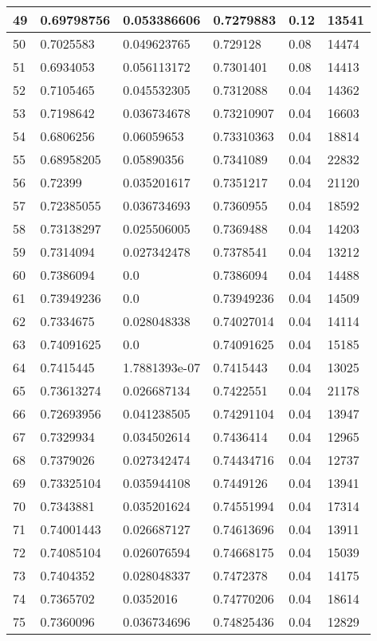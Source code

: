 \begin{longtable}{|l|l|l|l|l|l|}
49 & 0.69798756 & 0.053386606 & 0.7279883 & 0.12 & 13541 \\ \hline 
50 & 0.7025583 & 0.049623765 & 0.729128 & 0.08 & 14474 \\ \hline 
51 & 0.6934053 & 0.056113172 & 0.7301401 & 0.08 & 14413 \\ \hline 
52 & 0.7105465 & 0.045532305 & 0.7312088 & 0.04 & 14362 \\ \hline 
53 & 0.7198642 & 0.036734678 & 0.73210907 & 0.04 & 16603 \\ \hline 
54 & 0.6806256 & 0.06059653 & 0.73310363 & 0.04 & 18814 \\ \hline 
55 & 0.68958205 & 0.05890356 & 0.7341089 & 0.04 & 22832 \\ \hline 
56 & 0.72399 & 0.035201617 & 0.7351217 & 0.04 & 21120 \\ \hline 
57 & 0.72385055 & 0.036734693 & 0.7360955 & 0.04 & 18592 \\ \hline 
58 & 0.73138297 & 0.025506005 & 0.7369488 & 0.04 & 14203 \\ \hline 
59 & 0.7314094 & 0.027342478 & 0.7378541 & 0.04 & 13212 \\ \hline 
60 & 0.7386094 & 0.0 & 0.7386094 & 0.04 & 14488 \\ \hline 
61 & 0.73949236 & 0.0 & 0.73949236 & 0.04 & 14509 \\ \hline 
62 & 0.7334675 & 0.028048338 & 0.74027014 & 0.04 & 14114 \\ \hline 
63 & 0.74091625 & 0.0 & 0.74091625 & 0.04 & 15185 \\ \hline 
64 & 0.7415445 & 1.7881393e-07 & 0.7415443 & 0.04 & 13025 \\ \hline 
65 & 0.73613274 & 0.026687134 & 0.7422551 & 0.04 & 21178 \\ \hline 
66 & 0.72693956 & 0.041238505 & 0.74291104 & 0.04 & 13947 \\ \hline 
67 & 0.7329934 & 0.034502614 & 0.7436414 & 0.04 & 12965 \\ \hline 
68 & 0.7379026 & 0.027342474 & 0.74434716 & 0.04 & 12737 \\ \hline 
69 & 0.73325104 & 0.035944108 & 0.7449126 & 0.04 & 13941 \\ \hline 
70 & 0.7343881 & 0.035201624 & 0.74551994 & 0.04 & 17314 \\ \hline 
71 & 0.74001443 & 0.026687127 & 0.74613696 & 0.04 & 13911 \\ \hline 
72 & 0.74085104 & 0.026076594 & 0.74668175 & 0.04 & 15039 \\ \hline 
73 & 0.7404352 & 0.028048337 & 0.7472378 & 0.04 & 14175 \\ \hline 
74 & 0.7365702 & 0.0352016 & 0.74770206 & 0.04 & 18614 \\ \hline 
75 & 0.7360096 & 0.036734696 & 0.74825436 & 0.04 & 12829 \\ \hline 
\end{longtable}